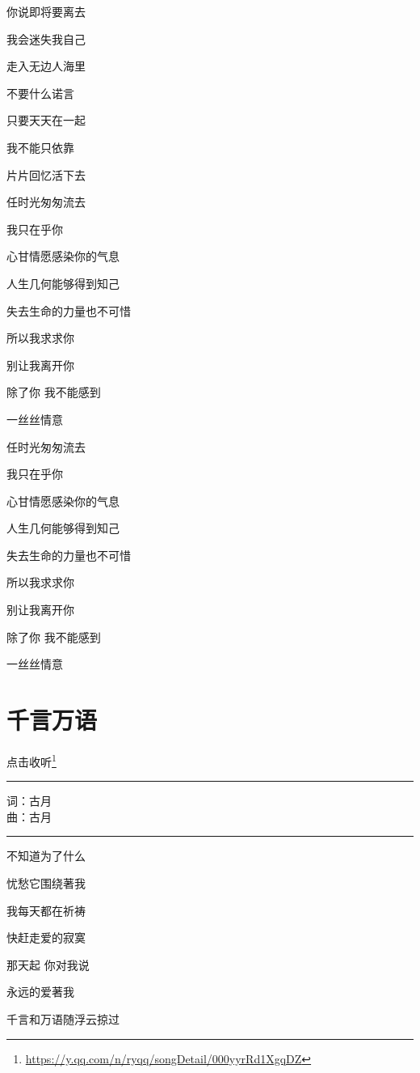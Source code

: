 \documentclass[]{ctexbook}
\renewcommand{\href}[2]{#2\footnote{\url{#1}}}
\begin{document}
你说即将要离去

我会迷失我自己

走入无边人海里

不要什么诺言

只要天天在一起

我不能只依靠

片片回忆活下去

任时光匆匆流去

我只在乎你

心甘情愿感染你的气息

人生几何能够得到知己

失去生命的力量也不可惜

所以我求求你

别让我离开你

除了你 我不能感到

一丝丝情意

任时光匆匆流去

我只在乎你

心甘情愿感染你的气息

人生几何能够得到知己

失去生命的力量也不可惜

所以我求求你

别让我离开你

除了你 我不能感到

一丝丝情意

\section*{千言万语}\label{thousands-of-words}


\href{https://y.qq.com/n/ryqq/songDetail/000yyrRd1XgqDZ}{点击收听}

\begin{center}\rule{0.5\linewidth}{0.5pt}\end{center}

词：古月\\
曲：古月

\begin{center}\rule{0.5\linewidth}{0.5pt}\end{center}

不知道为了什么

忧愁它围绕著我

我每天都在祈祷

快赶走爱的寂寞

那天起 你对我说

永远的爱著我

千言和万语随浮云掠过
\end{document}
